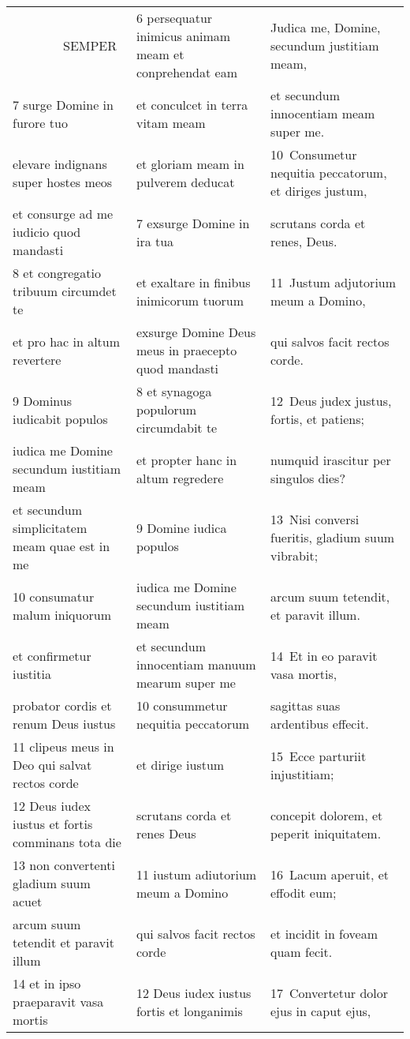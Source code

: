 \documentclass{article}
\begin{document}
\begin{longtable}{@{}p{}p{}p{}@{}}
    SEMPER	&	6 persequatur inimicus animam meam et conprehendat eam	&	Judica me, Domine, secundum justitiam meam,	\\
7 surge Domine in furore tuo	&	et conculcet in terra vitam meam	&	et secundum innocentiam meam super me.	\\
elevare indignans super hostes meos	&	et gloriam meam in pulverem deducat	&	10 Consumetur nequitia peccatorum, et diriges justum,	\\
et consurge ad me iudicio quod mandasti	&	7 exsurge Domine in ira tua	&	scrutans corda et renes, Deus.	\\
8 et congregatio tribuum circumdet te	&	et exaltare in finibus inimicorum tuorum	&	11 Justum adjutorium meum a Domino,	\\
et pro hac in altum revertere	&	exsurge Domine Deus meus in praecepto quod mandasti	&	qui salvos facit rectos corde.	\\
9 Dominus iudicabit populos	&	8 et synagoga populorum circumdabit te	&	12 Deus judex justus, fortis, et patiens;	\\
iudica me Domine secundum iustitiam meam	&	et propter hanc in altum regredere	&	numquid irascitur per singulos dies?	\\
et secundum simplicitatem meam quae est in me	&	9 Domine iudica populos	&	13 Nisi conversi fueritis, gladium suum vibrabit;	\\
10 consumatur malum iniquorum	&	iudica me Domine secundum iustitiam meam	&	arcum suum tetendit, et paravit illum.	\\
et confirmetur iustitia	&	et secundum innocentiam manuum mearum super me	&	14 Et in eo paravit vasa mortis,	\\
probator cordis et renum Deus iustus	&	10 consummetur nequitia peccatorum	&	sagittas suas ardentibus effecit.	\\
11 clipeus meus in Deo qui salvat rectos corde	&	et dirige iustum	&	15 Ecce parturiit injustitiam;	\\
12 Deus iudex iustus et fortis comminans tota die	&	scrutans corda et renes Deus	&	concepit dolorem, et peperit iniquitatem.	\\
13 non convertenti gladium suum acuet	&	11 iustum adiutorium meum a Domino	&	16 Lacum aperuit, et effodit eum;	\\
arcum suum tetendit et paravit illum	&	qui salvos facit rectos corde	&	et incidit in foveam quam fecit.	\\
14 et in ipso praeparavit vasa mortis	&	12 Deus iudex iustus fortis et longanimis	&	17 Convertetur dolor ejus in caput ejus,	\\

\end{longtable}
\end{document}
